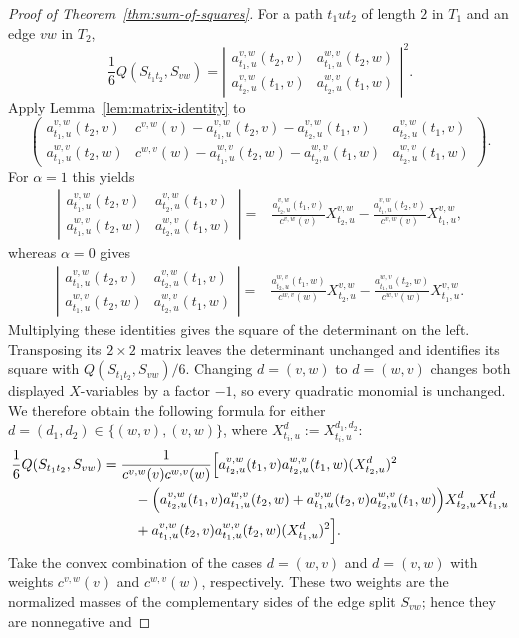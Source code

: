\documentclass[pdflatex,sn-mathphys-num]{sn-jnl}
\theoremstyle{thmstyleone}
\begin{document}
\begin{proof}[Proof of Theorem~\ref{thm:sum-of-squares}]
For a path $t_1ut_2$ of length $2$ in $T_1$ and an edge $vw$ in $T_2$,
\[
\frac16Q(S_{t_1t_2},S_{vw})=
\left|
\begin{matrix}
a_{t_1,u}^{v,w}(t_2,v)&a_{t_1,u}^{w,v}(t_2,w)\\
a_{t_2,u}^{v,w}(t_1,v)&a_{t_2,u}^{w,v}(t_1,w)
\end{matrix}
\right|^2.
\]
Apply Lemma~\ref{lem:matrix-identity} to
\begingroup
\small
\setlength{\arraycolsep}{12pt}
\renewcommand{\arraystretch}{1.12}
\[
\begin{pmatrix}
a_{t_1,u}^{v,w}(t_2,v)&
c^{v,w}(v)-a_{t_1,u}^{v,w}(t_2,v)-a_{t_2,u}^{v,w}(t_1,v)&
a_{t_2,u}^{v,w}(t_1,v)\\
a_{t_1,u}^{w,v}(t_2,w)&
c^{w,v}(w)-a_{t_1,u}^{w,v}(t_2,w)-a_{t_2,u}^{w,v}(t_1,w)&
a_{t_2,u}^{w,v}(t_1,w)
\end{pmatrix}.
\]
\endgroup
For $\alpha=1$ this yields
\begin{align*}
\left|
\begin{matrix}
a_{t_1,u}^{v,w}(t_2,v)&a_{t_2,u}^{v,w}(t_1,v)\\
a_{t_1,u}^{w,v}(t_2,w)&a_{t_2,u}^{w,v}(t_1,w)
\end{matrix}
\right|
={}&\frac{a_{t_2,u}^{v,w}(t_1,v)}{c^{v,w}(v)}X_{t_2,u}^{v,w}
-\frac{a_{t_1,u}^{v,w}(t_2,v)}{c^{v,w}(v)}X_{t_1,u}^{v,w},
\end{align*}
whereas $\alpha=0$ gives
\begin{align*}
\left|
\begin{matrix}
a_{t_1,u}^{v,w}(t_2,v)&a_{t_2,u}^{v,w}(t_1,v)\\
a_{t_1,u}^{w,v}(t_2,w)&a_{t_2,u}^{w,v}(t_1,w)
\end{matrix}
\right|
={}&\frac{a_{t_2,u}^{w,v}(t_1,w)}{c^{w,v}(w)}X_{t_2,u}^{v,w}
-\frac{a_{t_1,u}^{w,v}(t_2,w)}{c^{w,v}(w)}X_{t_1,u}^{v,w}.
\end{align*}
Multiplying these identities gives the square of the determinant on the
left.  Transposing its $2\times2$ matrix leaves the determinant unchanged
and identifies its square with $Q(S_{t_1t_2},S_{vw})/6$.  Changing
$d=(v,w)$ to $d=(w,v)$ changes both displayed $X$-variables by a factor
$-1$, so every quadratic monomial is unchanged.  We therefore obtain the
following formula for either
$d=(d_1,d_2)\in\{(w,v),(v,w)\}$, where
$X_{t_i,u}^{d}:=X_{t_i,u}^{d_1,d_2}$:
\begin{align*}
\frac16Q(S_{t_1t_2},S_{vw})
={}&\frac1{c^{v,w}(v)c^{w,v}(w)}
\Bigl[
a_{t_2,u}^{v,w}(t_1,v)a_{t_2,u}^{w,v}(t_1,w)(X_{t_2,u}^{d})^2\\
&\quad-\Bigl(
a_{t_2,u}^{v,w}(t_1,v)a_{t_1,u}^{w,v}(t_2,w)
+a_{t_1,u}^{v,w}(t_2,v)a_{t_2,u}^{w,v}(t_1,w)
\Bigr)X_{t_2,u}^{d}X_{t_1,u}^{d}\\
&\quad+a_{t_1,u}^{v,w}(t_2,v)a_{t_1,u}^{w,v}(t_2,w)(X_{t_1,u}^{d})^2
\Bigr].
\end{align*}
Take the convex combination of the cases $d=(w,v)$ and $d=(v,w)$ with
weights $c^{v,w}(v)$ and $c^{w,v}(w)$, respectively.  These two weights are
the normalized masses of the complementary sides of the edge split $S_{vw}$;
hence they are nonnegative and


\end{proof}
\end{document}
